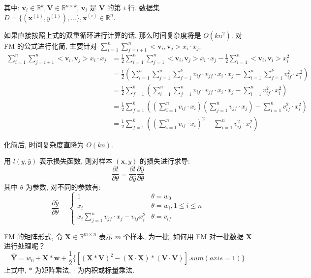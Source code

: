 其中: $\boldsymbol{v}_i \in \mathbb{R}^k, \boldsymbol{V} \in \mathbb{R}^{n \times k}$, $\boldsymbol{v}_i$ 是 $\boldsymbol{V}$ 的第 $i$ 行. 数据集 $D = \{ (\boldsymbol{x}^{(1)}, y^{(1)}), ... \}, \boldsymbol{x}^{(i)} \in \mathbb{R}^n$. 

如果直接按照上式的双重循环进行计算的话, 那么时间复杂度将是 $O(kn^2)$. 对 FM 的公式进行化简, 主要针对 $\sum_{i=1}^n \sum_{j = i+1}^n <\boldsymbol{v}_i, \boldsymbol{v}_j>x_i \cdot x_j$: 
$$
\begin{aligned}
	\sum_{i=1}^n \sum_{j = i+1}^n <\boldsymbol{v}_i, \boldsymbol{v}_j>x_i \cdot x_j &= \frac{1}{2} \sum_{i=1}^n \sum_{j=1}^n <\boldsymbol{v}_i, \boldsymbol{v}_j>x_i \cdot x_j - \frac{1}{2} \sum_{i=1}^n <\boldsymbol{v}_i, \boldsymbol{v}_i>x_i^2 \\
	&= \frac{1}{2} ( \sum_{i=1}^n \sum_{j=1}^n \sum_{f=1}^k v_{if}\cdot v_{jf} \cdot x_i \cdot x_j - \sum_{i=1}^n \sum_{f=1}^k v_{if}^2 \cdot x_i^2) \\ 
	&= \frac{1}{2} \sum_{f=1}^k ( \sum_{i=1}^n \sum_{j=1}^n v_{if}\cdot v_{jf} \cdot x_i \cdot x_j - \sum_{i=1}^n v_{if}^2 \cdot x_i^2)  \\
	&= \frac{1}{2} \sum_{f=1}^k ( (\sum_{i=1}^n v_{if} \cdot x_i)  (\sum_{j=1}^n v_{jf} \cdot x_j) - \sum_{i=1}^n v_{if}^2 \cdot x_i^2)  \\
	&= \frac{1}{2} \sum_{f=1}^k ( (\sum_{i=1}^n v_{if} \cdot x_i)^2 - \sum_{i=1}^n v_{if}^2 \cdot x_i^2)
\end{aligned}
$$

化简后, 时间复杂度直降为 $O(kn)$.

用 $l(y, \hat{y})$ 表示损失函数, 则对样本 $(\boldsymbol{x}, y)$ 的损失进行求导: 
$$
\frac{\partial l}{\partial \theta} = \frac{\partial l}{\partial \hat{y}} \frac{\partial \hat{y}}{\partial \theta}
$$
其中 $\theta$ 为参数, 对不同的参数有: 
$$
\frac{\partial \hat{y}}{\partial \theta} = 
\begin{cases}
	1 & \theta = w_0 \\
	x_i & \theta = w_i, 1 \leq i \leq n \\
	x_i \sum_{j=1}^n v_{jf}\cdot x_j - v_{if} x_i^2 & \theta = v_{if}
\end{cases}
$$

FM 的矩阵形式, 令 $\boldsymbol{X} \in \mathbb{R}^{m \times n}$ 表示 $m$ 个样本, 为一批, 如何用 FM 对一批数据 $\boldsymbol{X}$ 进行处理呢？
$$
\hat{\boldsymbol{Y}} = w_0 + \boldsymbol{X} * \boldsymbol{w} + \frac{1}{2} \{ [(\boldsymbol{X} * \boldsymbol{V})^2 - (\boldsymbol{X} \cdot \boldsymbol{X}) * (\boldsymbol{V} \cdot \boldsymbol{V})].sum(axis=1) \}
$$
上式中, $*$ 为矩阵乘法, $\cdot$ 为内积或标量乘法. 

